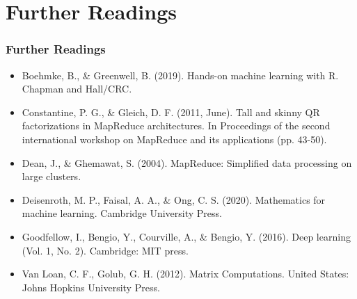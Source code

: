 \documentclass[
  shownotes,
  xcolor={svgnames},
  hyperref={colorlinks,citecolor=DarkBlue,linkcolor=DarkRed,urlcolor=DarkBlue}
  , aspectratio=169]{beamer}
\begin{document}

\section{Further Readings}
\begin{frame}
\frametitle{Further Readings}
\footnotesize
\begin{itemize}
  \item Boehmke, B., \& Greenwell, B. (2019). Hands-on machine learning with R. Chapman and Hall/CRC.
  \medskip
  \item Constantine, P. G., \& Gleich, D. F. (2011, June). Tall and skinny QR factorizations in MapReduce architectures. In Proceedings of the second international workshop on MapReduce and its applications (pp. 43-50).
  \medskip
  \item Dean, J., \& Ghemawat, S. (2004). MapReduce: Simplified data processing on large clusters.
  \medskip
  \item Deisenroth, M. P., Faisal, A. A., \& Ong, C. S. (2020). Mathematics for machine learning. Cambridge University Press.
  \medskip
  \item Goodfellow, I., Bengio, Y., Courville, A., \& Bengio, Y. (2016). Deep learning (Vol. 1, No. 2). Cambridge: MIT press.
  \medskip
  \item Van Loan, C. F., Golub, G. H. (2012). Matrix Computations. United States: Johns Hopkins University Press.
  
\end{itemize}

\end{frame}
\end{document}
